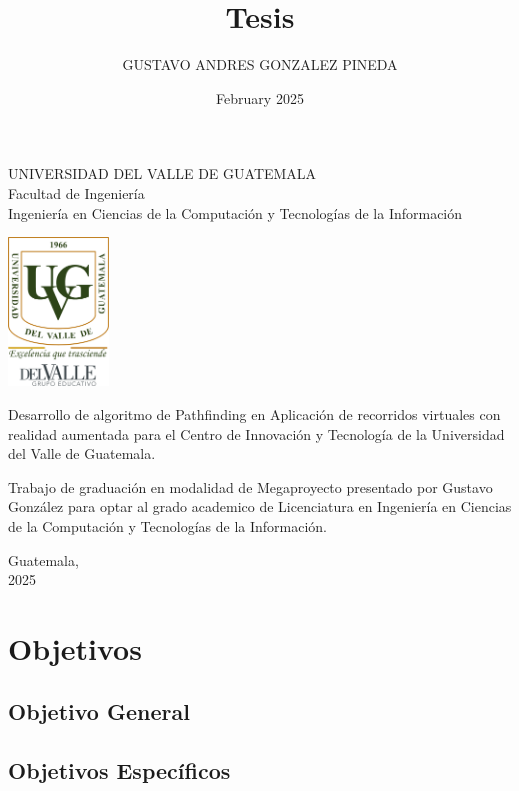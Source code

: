 \documentclass{article}
\title{Tesis}
\author{GUSTAVO ANDRES GONZALEZ PINEDA}
\date{February 2025}
\begin{document}
\begin{center}
\begin{doublespace}
    \Large{UNIVERSIDAD DEL VALLE DE GUATEMALA}\\
    Facultad de Ingeniería \\
    Ingeniería en Ciencias de la Computación y Tecnologías de la Información 

    \vspace{15mm} 
    \includegraphics[width=0.2\textwidth]{images/Uvg_logo.jpg}

    \vspace{15mm} 
    {\Large Desarrollo de algoritmo de Pathfinding en Aplicación de recorridos virtuales con realidad aumentada para el Centro de Innovación y Tecnología de la Universidad del Valle de Guatemala.}

    \vspace{10mm} 
    {\Large Trabajo de graduación en modalidad de Megaproyecto presentado por Gustavo González
    para optar al grado academico de Licenciatura en Ingeniería en Ciencias de la Computación y Tecnologías de la Información.}

    \vspace{10mm} 
    {\Large Guatemala, \\ 2025}
    
\end{doublespace}
\end{center}

\newpage
\section{Objetivos}
\subsection{Objetivo General}
{\justify }

\subsection{Objetivos Específicos}
\end{document}
